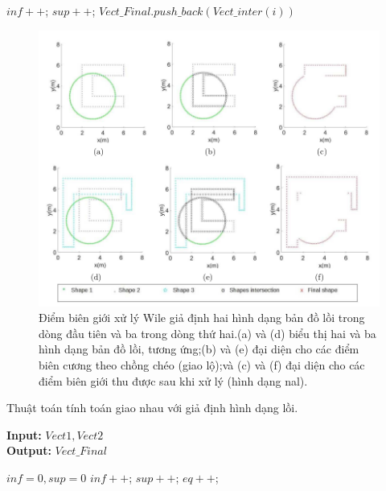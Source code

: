 \documentclass[11pt,openany]{book}
\begin{document}
\begin{algorimth}[H]
\begin{algorithm}[H]
\begin{algorithmic}[1]
        \STATE $inf++$;
        \ELSE
        \STATE $sup++$;
        \ENDIF
        \ENDFOR
        \STATE $Vect\_Final.push\_back(Vect\_inter(i))$
        \ENDIF
        \ENDFOR
    \end{algorithmic}
\end{algorithm}
\begin{figure}[H]
    \centering
    \includegraphics[scale=0.4]{assets/3_6.png}
    \caption{Điểm biên giới xử lý Wile giả định hai hình dạng bản đồ lồi trong dòng đầu tiên và ba trong dòng thứ hai.(a) và (d) biểu thị hai và ba hình dạng bản đồ lồi, tương ứng;(b) và (e) đại diện cho các điểm biên cương theo chồng chéo (giao lộ);và (c) và (f) đại diện cho các điểm biên giới thu được sau khi xử lý (hình dạng nal).}
    \label{fig:3.6}
\end{figure}
\begin{algorithm}[H]
    \caption{Thuật toán tính toán giao nhau với giả định hình dạng lồi.}
    \label{alg:3.4}
    \hspace*{\algorithmicindent} \textbf{Input:} $Vect1, Vect2$ \\
    \hspace*{\algorithmicindent} \textbf{Output:} $Vect\_Final$
    \begin{algorithmic}[1]
        \STATE $inf = 0, sup = 0$
        \STATE $inf++$;
        \STATE $sup++$;
        \ELSE
        \STATE $eq++$;

\end{algorithmic}
\end{algorithm}
\end{algorimth}
\end{document}
